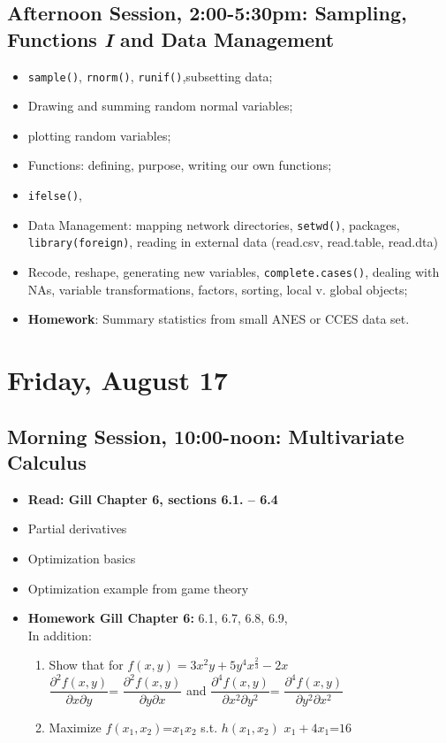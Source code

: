 \documentclass[12pt,a4paper]{article}
\begin{document}
\subsection*{Afternoon Session, 2:00-5:30pm: Sampling, Functions \emph{I} and Data Management}
\begin{itemize}
\setlength{\itemsep}{0pt}
\footnotesize
\item \texttt{sample()}, \texttt{rnorm()}, \texttt{runif()},subsetting data;
\item Drawing and summing random normal variables;
\item plotting random variables;
\item Functions: defining, purpose, writing our own functions;
\item \texttt{ifelse()},
\item Data Management: mapping network directories, \texttt{setwd()}, packages, \texttt{library(foreign)}, reading in external data (read.csv, read.table, read.dta)
\item Recode, reshape, generating new variables, \texttt{complete.cases()}, dealing with NAs, variable transformations, factors, sorting, local v. global objects;
\item \textbf{Homework}: Summary statistics from small ANES or CCES data set.
\end{itemize}



\section*{Friday, August 17}
\subsection*{Morning Session, 10:00-noon:  Multivariate Calculus}
\begin{itemize}
\setlength{\itemsep}{0pt}
\footnotesize
\item \textbf{Read: Gill Chapter 6, sections 6.1. -- 6.4}
\item Partial derivatives
\item Optimization basics
\item Optimization example from game theory
\item \textbf{Homework Gill Chapter 6:} 6.1, 6.7, 6.8, 6.9, \\ In addition: 
\begin{enumerate} 
\item Show that for $f(x,y) = 3x^{2}y+ 5y^{4}x^{\frac{2}{3}}-2x$\\ $\dfrac{\partial^2 f(x,y)}{\partial x \partial y}$= $\dfrac{\partial^2 f(x,y)}{\partial y \partial x}$ and  $\dfrac{\partial^4 f(x,y)}{\partial x^2 \partial y^2}$= $\dfrac{\partial^4 f(x,y)}{\partial y^2 \partial x^2}$\\
\item Maximize $f(x_1, x_2)$=$x_1x_2$ s.t. $h(x_1, x_2)$ $x_1+4x_1$=$16$
\end{enumerate}


\end{itemize}
\end{document}
